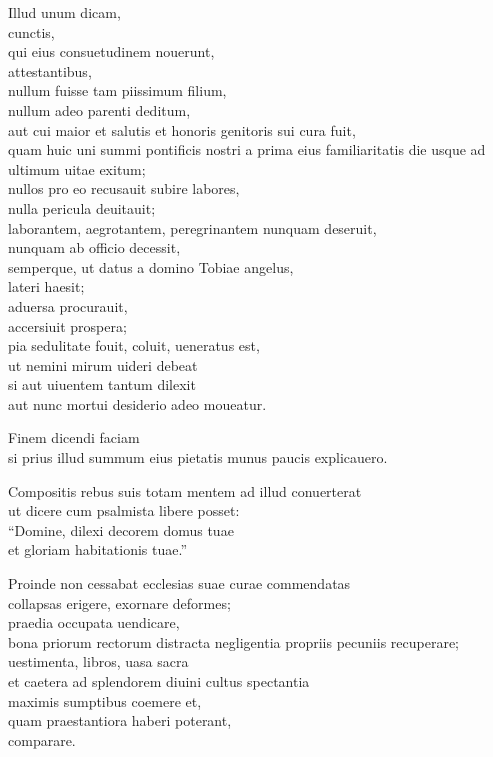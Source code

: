 \documentclass[a5paper,twoside]{article}
\begin{document}
Illud unum dicam, \\
cunctis, \\
qui eius consuetudinem nouerunt, \\
attestantibus, \\
nullum fuisse tam piissimum filium, \\
nullum adeo parenti deditum, \\
aut cui maior et salutis et honoris genitoris sui cura fuit, \\
quam huic uni summi pontificis nostri a prima eius familiaritatis die usque ad ultimum uitae exitum; \\
nullos pro eo recusauit subire labores, \\
nulla pericula deuitauit; \\
laborantem, aegrotantem, peregrinantem nunquam deseruit, \\
nunquam ab officio decessit, \\
semperque, ut datus a domino Tobiae angelus, \\
lateri haesit; \\
aduersa procurauit, \\
accersiuit prospera; \\
pia sedulitate fouit, coluit, ueneratus est, \\
ut nemini mirum uideri debeat \\
si aut uiuentem tantum dilexit \\
aut nunc mortui desiderio adeo moueatur.

Finem dicendi faciam \\
si prius illud summum eius pietatis munus paucis explicauero.  

Compositis rebus suis totam mentem ad illud conuerterat \\
ut dicere cum psalmista libere posset: \\
``Domine, dilexi decorem domus tuae \\
et gloriam habitationis tuae.''  

Proinde non cessabat ecclesias suae curae commendatas \\
collapsas erigere, exornare deformes; \\
praedia occupata uendicare, \\
bona priorum rectorum distracta negligentia propriis pecuniis recuperare; \\
uestimenta, libros, uasa sacra \\
et caetera ad splendorem diuini cultus spectantia \\
maximis sumptibus coemere et, \\
quam praestantiora haberi poterant, \\
comparare.  
\end{document}
